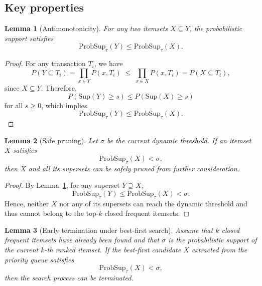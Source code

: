 \documentclass[10pt,letterpaper]{article}
\newtheorem{lemma}{Lemma}
\begin{document}
\subsection*{Key properties}
\label{subsec:key_properties}

\begin{lemma}[Antimonotonicity]
\label{lem:antimonotonicity}
For any two itemsets $X \subseteq Y$, the probabilistic support satisfies
\begin{equation}
\mathrm{ProbSup}_{\tau}(Y) \leq \mathrm{ProbSup}_{\tau}(X).
\label{eq:antimonotonicity}
\end{equation}
\end{lemma}

\begin{proof}
For any transaction $T_i$, we have
\[
P(Y \subseteq T_i) = \prod_{x \in Y} P(x,T_i)
\;\leq\; \prod_{x \in X} P(x,T_i) = P(X \subseteq T_i),
\]
since $X \subseteq Y$. Therefore,
\[
P(\mathrm{Sup}(Y) \ge s) \le P(\mathrm{Sup}(X) \ge s)
\]
for all $s \ge 0$, which implies
\[
\mathrm{ProbSup}_{\tau}(Y) \le \mathrm{ProbSup}_{\tau}(X).
\]
\end{proof}

\begin{lemma}[Safe pruning]
\label{lem:safe_pruning}
Let $\sigma$ be the current dynamic threshold.  
If an itemset $X$ satisfies
\begin{equation}
\mathrm{ProbSup}_{\tau}(X) < \sigma,
\label{eq:safe_prune}
\end{equation}
then $X$ and all its supersets can be safely pruned from further consideration.
\end{lemma}

\begin{proof}
By Lemma~\ref{lem:antimonotonicity}, for any superset $Y \supseteq X$,
\[
\mathrm{ProbSup}_{\tau}(Y) \le \mathrm{ProbSup}_{\tau}(X) < \sigma.
\]
Hence, neither $X$ nor any of its supersets can reach the dynamic threshold and thus cannot belong to the top-$k$ closed frequent itemsets.
\end{proof}

\begin{lemma}[Early termination under best-first search]
\label{lem:early_termination}
Assume that $k$ closed frequent itemsets have already been found and that $\sigma$ is the probabilistic support of the current $k$-th ranked itemset.  
If the best-first candidate $X$ extracted from the priority queue satisfies
\begin{equation}
\mathrm{ProbSup}_{\tau}(X) < \sigma,
\label{eq:early_stop}
\end{equation}
then the search process can be terminated.
\end{lemma}
\end{document}
